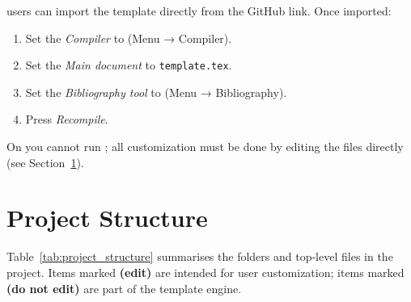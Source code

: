 \Overleaf{} users can import the template directly from the GitHub link.
Once imported:

\begin{enumerate}
  \item Set the \emph{Compiler} to \textbf{} (Menu → Compiler).
  \item Set the \emph{Main document} to \verb!template.tex!.
  \item Set the \emph{Bibliography tool} to \textbf{}
    (Menu → Bibliography).
  \item Press \emph{Recompile}.
\end{enumerate}

On \Overleaf{} you cannot run ;
all customization must be done by editing the  files
directly (see Section~\ref{sec:project_structure}).


\section{Project Structure}
\label{sec:project_structure}

Table~\ref{tab:project_structure} summarises the folders and top-level
files in the project.  Items marked \textbf{(edit)} are intended for user
customization; items marked \textbf{(do not edit)} are part of the template
engine.


